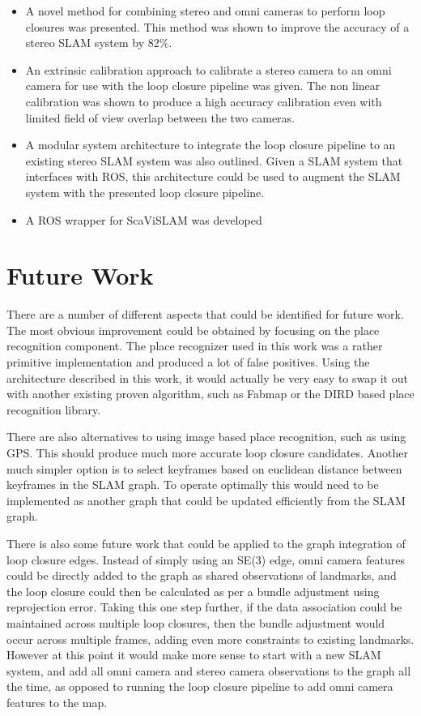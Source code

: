 \begin{itemize}
 \item A novel method for combining stereo and omni cameras to perform loop closures was presented.  This method was shown to improve the accuracy of a stereo SLAM system by 82\%.
 \item An extrinsic calibration approach to calibrate a stereo camera to an omni camera for use with the loop closure pipeline was given.  The non linear calibration was shown to produce a high accuracy calibration even with limited field of view overlap between the two cameras.
 \item A modular system architecture to integrate the loop closure pipeline to an existing stereo SLAM system was also outlined.  Given a SLAM system that interfaces with ROS, this architecture could be used to augment the SLAM system with the presented loop closure pipeline.
 \item A ROS wrapper for ScaViSLAM was developed
\end{itemize}

\section{Future Work}

There are a number of different aspects that could be identified for future work.  The most obvious improvement could be obtained by focusing on the place recognition component.  The place recognizer used in this work was a rather primitive implementation and produced a lot of false positives.  Using the architecture described in this work, it would actually be very easy to swap it out with another existing proven algorithm, such as Fabmap\cite{fabmap} or the DIRD\cite{lategahn_13} based place recognition library.

There are also alternatives to using image based place recognition, such as using GPS.  This should produce much more accurate loop closure candidates.  Another much simpler option is to select keyframes based on euclidean distance between keyframes in the SLAM graph.  To operate optimally this would need to be implemented as another graph that could be updated efficiently from the SLAM graph.

There is also some future work that could be applied to the graph integration of loop closure edges.  Instead of simply using an SE(3) edge, omni camera features could be directly added to the graph as shared observations of landmarks, and the loop closure could then be calculated as per a bundle adjustment using reprojection error.  Taking this one step further, if the data association could be maintained across multiple loop closures, then the bundle adjustment would occur across multiple frames, adding even more constraints to existing landmarks.  However at this point it would make more sense to start with a new SLAM system, and add all omni camera and stereo camera observations to the graph all the time, as opposed to running the loop closure pipeline to add omni camera features to the map.

